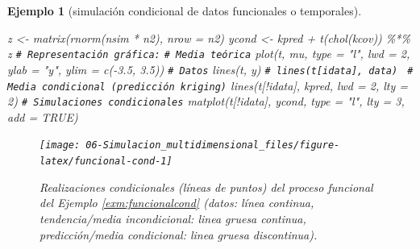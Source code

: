 \documentclass[
]{book}
\newenvironment{Shaded}{\begin{snugshade}}{\end{snugshade}}
\newcommand{\AttributeTok}[1]{\textcolor[rgb]{0.77,0.63,0.00}{#1}}
\newcommand{\CommentTok}[1]{\textcolor[rgb]{0.56,0.35,0.01}{\textit{#1}}}
\newcommand{\ConstantTok}[1]{\textcolor[rgb]{0.00,0.00,0.00}{#1}}
\newcommand{\DecValTok}[1]{\textcolor[rgb]{0.00,0.00,0.81}{#1}}
\newcommand{\FloatTok}[1]{\textcolor[rgb]{0.00,0.00,0.81}{#1}}
\newcommand{\FunctionTok}[1]{\textcolor[rgb]{0.00,0.00,0.00}{#1}}
\newcommand{\NormalTok}[1]{#1}
\newcommand{\OtherTok}[1]{\textcolor[rgb]{0.56,0.35,0.01}{#1}}
\newcommand{\SpecialCharTok}[1]{\textcolor[rgb]{0.00,0.00,0.00}{#1}}
\newcommand{\StringTok}[1]{\textcolor[rgb]{0.31,0.60,0.02}{#1}}
\theoremstyle{break}
\newtheorem{example}{Ejemplo}[chapter]
\theoremstyle{nonumberplain}
\renewcommand{\CommentTok}[1]{\textcolor[rgb]{0.41,0.41,0.41}{\texttt{#1}}}
\begin{document}
\begin{example}[simulación condicional de datos funcionales o temporales]
\begin{Shaded}
\begin{Highlighting}[]
\NormalTok{z }\OtherTok{\textless{}{-}} \FunctionTok{matrix}\NormalTok{(}\FunctionTok{rnorm}\NormalTok{(nsim }\SpecialCharTok{*}\NormalTok{ n2), }\AttributeTok{nrow =}\NormalTok{ n2)}
\NormalTok{ycond }\OtherTok{\textless{}{-}}\NormalTok{ kpred }\SpecialCharTok{+} \FunctionTok{t}\NormalTok{(}\FunctionTok{chol}\NormalTok{(kcov)) }\SpecialCharTok{\%*\%}\NormalTok{ z}
\CommentTok{\# Representación gráfica:}
\CommentTok{\#   Media teórica}
\FunctionTok{plot}\NormalTok{(t, mu, }\AttributeTok{type =} \StringTok{"l"}\NormalTok{, }\AttributeTok{lwd =} \DecValTok{2}\NormalTok{, }\AttributeTok{ylab =} \StringTok{"y"}\NormalTok{, }\AttributeTok{ylim =} \FunctionTok{c}\NormalTok{(}\SpecialCharTok{{-}}\FloatTok{3.5}\NormalTok{, }\FloatTok{3.5}\NormalTok{)) }
\CommentTok{\#   Datos}
\FunctionTok{lines}\NormalTok{(t, y) }\CommentTok{\# lines(t[idata], data) }
\CommentTok{\#   Media condicional (predicción kriging)}
\FunctionTok{lines}\NormalTok{(t[}\SpecialCharTok{!}\NormalTok{idata], kpred, }\AttributeTok{lwd =} \DecValTok{2}\NormalTok{, }\AttributeTok{lty =} \DecValTok{2}\NormalTok{)}
\CommentTok{\#   Simulaciones condicionales}
\FunctionTok{matplot}\NormalTok{(t[}\SpecialCharTok{!}\NormalTok{idata], ycond, }\AttributeTok{type =} \StringTok{"l"}\NormalTok{, }\AttributeTok{lty =} \DecValTok{3}\NormalTok{, }\AttributeTok{add =} \ConstantTok{TRUE}\NormalTok{) }
\end{Highlighting}
\end{Shaded}

\begin{figure}[!htb]

{\centering \texttt{[image: 06-Simulacion\_multidimensional\_files/figure-latex/funcional-cond-1]} 

}

\caption{Realizaciones condicionales (líneas de puntos) del proceso funcional del Ejemplo \ref{exm:funcionalcond} (datos: línea continua, tendencia/media incondicional: linea gruesa continua, predicción/media condicional: linea gruesa discontinua).}\label{fig:funcional-cond}
\end{figure}

\end{example}
\end{document}
